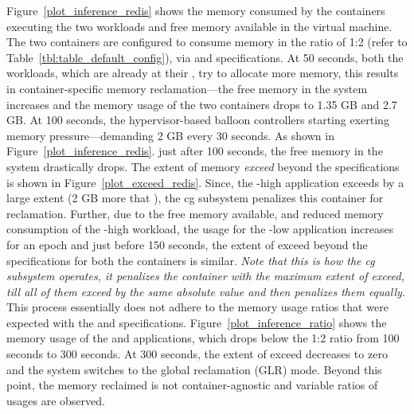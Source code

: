       Figure~\ref{plot_inference_redis} shows the memory consumed by the 
      containers executing the two \redis{} workloads and free memory 
      available in the virtual machine.
      The two containers are configured to consume memory in the ratio of 1:2
      (refer to Table~\ref{tbl:table_default_config}), via \hl{} and \sol{}
      specifications. At 50 seconds, both the \redis{} workloads, which
      are already at their \hl{}, try to allocate more memory, this results
      in container-specific memory reclamation---the free memory in the
      system increases and the memory usage of the two containers drops
      to 1.35 GB and 2.7 GB.
      At 100 seconds, the hypervisor-based balloon controllers starting
      exerting memory pressure---demanding 2 GB every 30 seconds.
      As shown in Figure~\ref{plot_inference_redis}.
      just after 100 seconds, the free memory in the system drastically drops.
      The extent of memory \emph{exceed} beyond 
      the \sol{} specifications is shown in Figure~\ref{plot_exceed_redis}.
      Since, the \redis-high application exceeds by a large extent (2 GB more
      that \sol), the cg{} subsystem penalizes this container for 
      reclamation.
      Further, due
      to the free memory available, and reduced memory consumption of the 
      \redis-high workload, the usage for the \redis-low application 
      increases for an epoch and just before 150 seconds, the extent
      of exceed beyond the \sol{} specifications for both the containers
      is similar. \emph{Note that this is how the cg{} subsystem operates,
      it penalizes the container with the maximum extent of exceed, till
      all of them exceed by the same absolute value and then 
      penalizes them equally.} This process essentially does not
      adhere to the memory usage ratios that were expected with the
      \sol{} and \hl{} specifications. Figure~\ref{plot_inference_ratio}
      shows the memory usage of the \redis{} and \mongo{} applications,
      which drops below the 1:2 ratio from 100 seconds to 300 seconds.
      At 300 seconds, the extent of exceed decreases to zero and
      the system switches to the global reclamation (GLR) mode.
      Beyond this point, the memory reclaimed is not container-agnostic
      and variable ratios of usages are observed.
    
